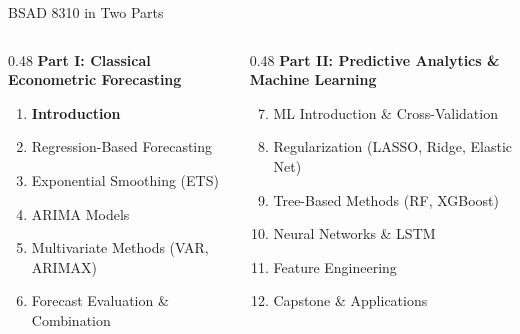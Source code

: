 \documentclass[aspectratio=169, 11pt]{beamer}
\begin{document}
\begin{frame}{BSAD 8310 in Two Parts}
  \begin{columns}[T]
    \begin{column}{0.48\textwidth}
      \textbf{Part I: Classical Econometric Forecasting}
      \begin{enumerate}
        \item \textbf{Introduction} 
        \item Regression-Based Forecasting
        \item Exponential Smoothing (ETS)
        \item ARIMA Models
        \item Multivariate Methods (VAR, ARIMAX)
        \item Forecast Evaluation \& Combination
      \end{enumerate}
      \vspace{0.2cm}
    \end{column}
    \begin{column}{0.48\textwidth}
      \textbf{Part II: Predictive Analytics \& Machine Learning}
      \begin{enumerate}
        \setcounter{enumi}{6}
        \item ML Introduction \& Cross-Validation
        \item Regularization (LASSO, Ridge, Elastic Net)
        \item Tree-Based Methods (RF, XGBoost)
        \item Neural Networks \& LSTM
        \item Feature Engineering
        \item Capstone \& Applications
      \end{enumerate}
      \vspace{0.2cm}
    \end{column}
  \end{columns}
\end{frame}
\end{document}
